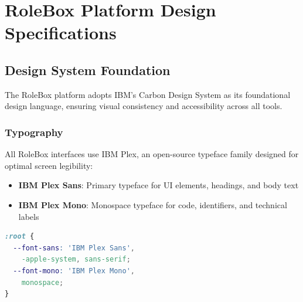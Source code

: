 \chapter{RoleBox Platform Design Specifications}

\begin{abstract}
This appendix documents the design requirements, technical specifications, and user experience guidelines for the RoleBox multimodal analysis platform. RoleBox provides interactive browser-based tools for exploring, coding, and visualizing organizational role data across eight modalities: websites, social media, Crunchbase, visual materials, news media, Wikipedia, role simulation, and cross-modal schema integration.
\end{abstract}

\section{Design System Foundation}

The RoleBox platform adopts IBM's Carbon Design System as its foundational design language, ensuring visual consistency and accessibility across all tools.

\subsection{Typography}

All RoleBox interfaces use IBM Plex, an open-source typeface family designed for optimal screen legibility:

\begin{itemize}
    \item \textbf{IBM Plex Sans}: Primary typeface for UI elements, headings, and body text
    \item \textbf{IBM Plex Mono}: Monospace typeface for code, identifiers, and technical labels
\end{itemize}

\begin{marginfigure}
\begin{lstlisting}[language=CSS,basicstyle=\tiny\ttfamily]
:root {
  --font-sans: 'IBM Plex Sans',
    -apple-system, sans-serif;
  --font-mono: 'IBM Plex Mono',
    monospace;
}
\end{lstlisting}
\caption{CSS custom property definitions for RoleBox typography.}
\end{marginfigure}


